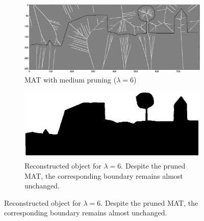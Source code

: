 \begin{figure}
	\begin{subfigure}{0.4\linewidth}
	\includegraphics[width=\linewidth]{figs/rasterimpl/simple_dtm-gamma6_earthskel_.png}
	\caption{MAT with medium pruning ($\lambda=6$)}
	\label{fig:imaimp:c}
	\end{subfigure}
	\quad
	\begin{subfigure}{0.4\linewidth}
	\includegraphics[width=\linewidth]{figs/rasterimpl/simple_dtm-gamma6_earthskel.png}
	\caption{Reconstructed object for $\lambda=6$. Despite the pruned MAT, the corresponding boundary remains almost unchanged.}
	\label{fig:imaimp:d}
	\end{subfigure}
	

\end{figure}

